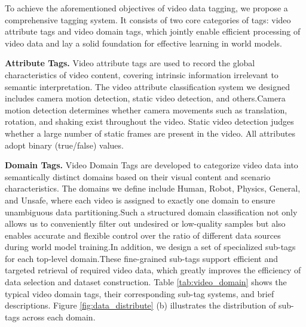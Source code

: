To achieve the aforementioned objectives of video data tagging, we propose a comprehensive tagging system. It consists of two core categories of tags: video attribute tags and video domain tags, which jointly enable efficient processing of video data and lay a solid foundation for effective learning in world models.

\textbf{Attribute Tags.} Video attribute tags are used to record the global characteristics of video content, covering intrinsic information irrelevant to semantic interpretation. The video attribute classification system we designed includes camera motion detection, static video detection, and others.Camera motion detection determines whether camera movements such as translation, rotation, and shaking exist throughout the video. Static video detection judges whether a large number of static frames are present in the video. All attributes adopt binary (true/false) values.



\textbf{Domain Tags.} Video Domain Tags are developed to categorize video data into semantically distinct domains based on their visual content and scenario characteristics. The domains we define include Human, Robot, Physics, General, and Unsafe, where each video is assigned to exactly one domain to ensure unambiguous data partitioning.Such a structured domain classification not only allows us to conveniently filter out undesired or low-quality samples but also enables accurate and flexible control over the ratio of different data sources during world model training.In addition, we design a set of specialized sub-tags for each top-level domain.These fine-grained sub-tags support efficient and targeted retrieval of required video data, which greatly improves the efficiency of data selection and dataset construction. Table \ref{tab:video_domain} shows the typical video domain tags, their corresponding sub-tag systems, and brief descriptions. Figure \ref{fig:data_distribute} (b) illustrates the distribution of sub-tags across each domain.




